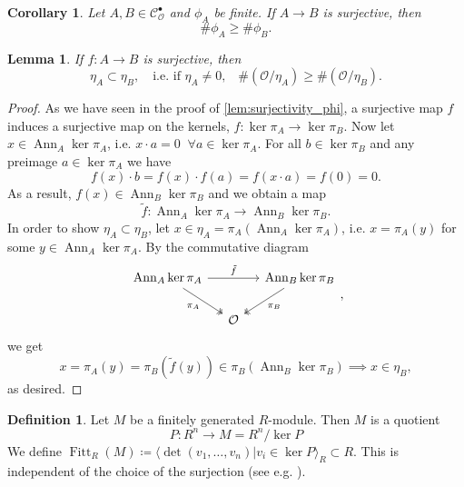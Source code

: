 \documentclass{article}
\theoremstyle{plain}%
\newtheorem{lemma}[theorem]{Lemma}
\newtheorem{corollary}[theorem]{Corollary}
\theoremstyle{definition}
\newtheorem{definition}[theorem]{Definition}
\theoremstyle{remark}
\newcommand{\cob}{\mathcal{C}_\mathcal{O}^\bullet}
\newcommand{\ann}{\operatorname{Ann}}
\newcommand{\fitt}{\operatorname{Fitt}}
\begin{document}
\begin{corollary}\label{cor:surjectivity_phi}
    Let \(A, B\in \cob\) and \(\phi_A\) be finite. %
    If \(A \to B\) is surjective, then \[\# \phi_A \geq \# \phi_B.\]
\end{corollary}

\begin{lemma}\label{lem:surjectivity_eta}
    If \(f \colon A \to B\) is surjective, then
    \begin{equation*}
        \eta_A \subset \eta_B, \quad \text{i.e. if \(\eta_A \neq 0\),}\quad \#(\mathcal{O}/\eta_A) \geq \#(\mathcal{O}/\eta_B).  
    \end{equation*}
\end{lemma}
\begin{proof}
    As we have seen in the proof of \cref{lem:surjectivity_phi}, a surjective map \(f\) induces a surjective
    map on the kernels, \(f\colon \ker \pi_A \to \ker\pi_B\).
    Now let \(x \in \ann_A \ker \pi_A\), i.e. \(x \cdot a = 0\;\; \forall a \in \ker \pi_A\).
    For all \(b \in \ker \pi_B\) and any preimage \(a \in \ker \pi_A\) we have
    \[
        f(x) \cdot b = f(x) \cdot f(a) = f(x \cdot a) = f(0) = 0.
    \]
    As a result, \(f(x) \in \ann_B\ker \pi_B\) and we obtain a map
    \[
        \tilde f\colon\ann_A\ker \pi_A \to \ann_B \ker \pi_B.  
    \]
    In order to show \(\eta_A \subset \eta_B\), let \(x \in \eta_A = \pi_A(\ann_A \ker \pi_A)\), i.e.
    \(x = \pi_A(y)\) for some \(y \in \ann_A \ker \pi_A\). By the commutative diagram
    \[
    \begin{tikzcd}[column sep=small]
        \ann_A \ker \pi_A \arrow[rr, "\tilde f"] \arrow [dr, "\pi_A", swap, twoheadrightarrow] 
        & & \ann_B \ker \pi_B \arrow [dl, "\pi_B", twoheadrightarrow]\\
        & \mathcal{O} &
    \end{tikzcd},
    \]
    we get
    \[
        x = \pi_A(y) = \pi_B(\tilde f(y)) \in \pi_B(\ann_B \ker \pi_B) \implies x \in \eta_B,
    \]
    as desired.
\end{proof}

\begin{definition}
    Let \(M\) be a finitely generated \(R\)-module. Then \(M\) is a quotient
    \[
        P \colon R^n \longrightarrow M = R^n/\ker P
    \]
    We define \(\fitt_R(M) \coloneqq \langle \det(v_1, \dots, v_n) | v_i \in \ker P \rangle_R \subset R\).
    This is independent of the choice of the surjection 
    (see e.g. \cite[\href{https://stacks.math.columbia.edu/tag/07Z6}{section 07Z6}]{stacks-project}).
\end{definition}
\end{document}
